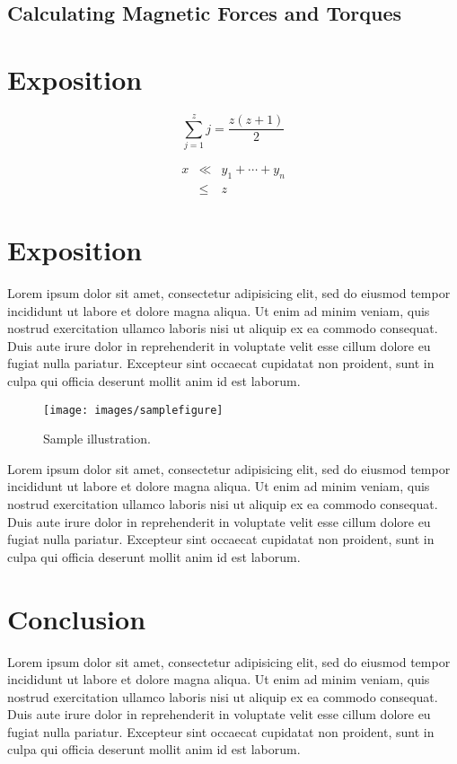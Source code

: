 \documentclass[tog]{acmsiggraph}
\begin{document}
\subsection{Calculating Magnetic Forces and Torques}

\section{Exposition}

\begin{equation}
 \sum_{j=1}^{z} j = \frac{z(z+1)}{2}
\end{equation}

\begin{eqnarray}
x & \ll & y_{1} + \cdots + y_{n} \\
  & \leq & z
\end{eqnarray}

\section{Exposition}

Lorem ipsum dolor sit amet, consectetur adipisicing elit, sed do
eiusmod tempor incididunt ut labore et dolore magna aliqua. Ut enim ad
minim veniam, quis nostrud exercitation ullamco laboris nisi ut
aliquip ex ea commodo consequat. Duis aute irure dolor in
reprehenderit in voluptate velit esse cillum dolore eu fugiat nulla
pariatur. Excepteur sint occaecat cupidatat non proident, sunt in
culpa qui officia deserunt mollit anim id est laborum.
\begin{figure}[ht]
  \centering
  \texttt{[image: images/samplefigure]}
  \caption{Sample illustration.}
\end{figure}
Lorem ipsum dolor sit amet, consectetur adipisicing elit, sed do
eiusmod tempor incididunt ut labore et dolore magna aliqua. Ut enim ad
minim veniam, quis nostrud exercitation ullamco laboris nisi ut
aliquip ex ea commodo consequat. Duis aute irure dolor in
reprehenderit in voluptate velit esse cillum dolore eu fugiat nulla
pariatur. Excepteur sint occaecat cupidatat non proident, sunt in
culpa qui officia deserunt mollit anim id est laborum.

\section{Conclusion}

Lorem ipsum dolor sit amet, consectetur adipisicing elit, sed do
eiusmod tempor incididunt ut labore et dolore magna aliqua. Ut enim ad
minim veniam, quis nostrud exercitation ullamco laboris nisi ut
aliquip ex ea commodo consequat. Duis aute irure dolor in
reprehenderit in voluptate velit esse cillum dolore eu fugiat nulla
pariatur. Excepteur sint occaecat cupidatat non proident, sunt in
culpa qui officia deserunt mollit anim id est laborum.
\end{document}
